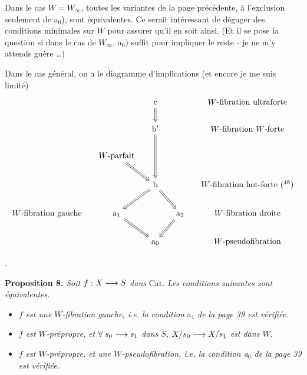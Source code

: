 Dans le cas $W=W_\infty$, toutes les variantes de la page précédente, à l'exclusion seulement de a$_0$), sont équivalentes. Ce serait intéressant de dégager des conditions minimales sur $W$ pour assurer qu'il en soit ainsi. (Et il se pose la question si dans le cas de $W_\infty$, a$_0$) suffit pour impliquer le reste - je ne m'y attends guère \dots)

Dans le cas général, on a le diagramme d'implications (et encore je me suis limité)
\[
\begin{tikzcd}[column sep=small]
 & & \mathrm{c} \arrow[d, Rightarrow] & & \text{$W$-fibration ultraforte} \\
 & & \mathrm{b}' \arrow[dd, Rightarrow] & & \text{$W$-fibration $W$-forte} \\
 & \text{$W$-parfait} \arrow[dr, Rightarrow] & & & \\
 & & \mathrm{b} \arrow[dl, Rightarrow] \arrow[dr, Rightarrow] & & \text{$W$-fibration hot-forte (\footnotemark[48])} \\
\text{$W$-fibration gauche} & \mathrm{a}_1 \arrow[dr, Rightarrow] & & \mathrm{a}_2 \arrow[dl, Rightarrow] & \text{$W$-fibration droite} \\
 & & \mathrm{a}_0 & & \text{$W$-pseudofibration}
\end{tikzcd}
\]

.

\textbf{Proposition 8.} \textit{Soit $f : X\longrightarrow S$ dans} Cat. \textit{Les conditions suivantes sont équivalentes.}

\begin{itemize}
\item[\textit{a)}] \textit{$f$ est une $W$-fibration gauche, i.e. la condition} a$_1$ \textit{de la page 39 est vérifiée.}

\item[\textit{b)}] \textit{$f$ est $W$-prépropre, et $\forall\; s_0\longrightarrow s_1$ dans $S$, $X/s_0\longrightarrow X/s_1$ est dans $W$.}

\item[\textit{c)}] \textit{$f$ est $W$-prépropre, et une $W$-pseudofibration, i.e. la condition a$_0$ de la page 39 est vérifiée.} %
\end{itemize}

